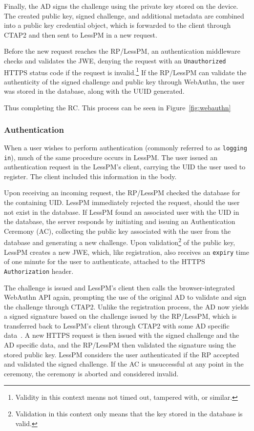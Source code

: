 Finally, the AD signs the challenge using the private key stored on the
device.
The created public key, signed challenge, and additional metadata are combined
into a public key credential object, which is forwarded to the client
through CTAP2 and then sent to LessPM in a new request.

Before the new request reaches the RP/LessPM, an authentication middleware
checks and validates the JWE, denying the request with an \texttt{Unauthorized}
HTTPS status code if the request is invalid.\footnote{
  Validity in this context means not timed out, tampered with, or similar.
}
If the RP/LessPM can validate the authenticity of the signed challenge and
public key through WebAuthn, the user was stored in the database, along with the
UUID generated.

Thus completing the RC\@.
This process can be seen in Figure~\ref{fig:webauthn}


\subsubsection{Authentication}\label{subsubsec:metho-authentication}
When a user wishes to perform authentication (commonly referred to as
\texttt{logging in}), much of the same procedure occurs in LessPM.
The user issued an authentication request in the LessPM's client, carrying
the UID the user used to register.
The client included this information in the body.

Upon receiving an incoming request, the RP/LessPM checked the database for
the containing UID\@.
LessPM immediately rejected the request, should the user not exist in the
database.
If LessPM found an associated user with the UID in the database, the server
responds by initiating and issuing an Authentication Ceremony (AC),
collecting the public key associated with the user from the database and
generating a new challenge.
Upon validation\footnote{
  Validation in this context only means that the key stored in the database
  is valid.
} of the public key, LessPM creates a new JWE, which, like registration, also
receives an \texttt{expiry} time of one minute for the user to authenticate,
attached to the HTTPS \texttt{Authorization} header.

The challenge is issued and LessPM's client then calls the
browser-integrated WebAuthn API again, prompting the use of the original AD
to validate and sign the challenge through CTAP2.
Unlike the registration process, the AD now yields a signed signature based
on the challenge issued by the RP/LessPM\@, which is transferred back to
LessPM's client through CTAP2 with some AD specific
data~\cite{webauthn_authenticator_data}.
A new HTTPS request is then issued with the signed challenge and the AD specific
data, and the RP/LessPM then validated the signature using the stored public
key.
LessPM considers the user authenticated if the RP accepted and validated the
signed challenge.
If the AC is unsuccessful at any point in the ceremony, the ceremony is
aborted and considered invalid.

